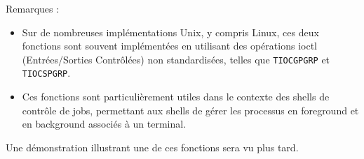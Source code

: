 Remarques :
\begin{itemize}
    \item Sur de nombreuses implémentations Unix, y compris Linux, ces deux fonctions sont souvent implémentées en utilisant des opérations ioctl (Entrées/Sorties Contrôlées) non standardisées, telles que \texttt{TIOCGPGRP} et \texttt{TIOCSPGRP}.
    \item Ces fonctions sont particulièrement utiles dans le contexte des shells de contrôle de jobs, permettant aux shells de gérer les processus en foreground et en background associés à un terminal.
\end{itemize}

Une démonstration illustrant une de ces fonctions sera vu plus tard.



